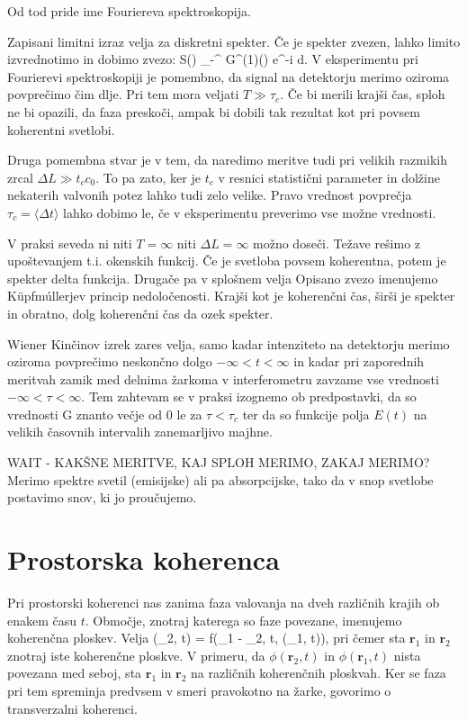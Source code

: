 Od tod pride ime Fouriereva spektroskopija. 

Zapisani limitni izraz velja za diskretni spekter. Če je spekter zvezen, lahko limito izvrednotimo in dobimo
zvezo:
\beq
S(\omega) \propto \int_{-\infty}^{\infty} G^{(1)}(\tau) e^{-i\omega \tau} d\tau.
\eeq
V eksperimentu pri Fourierevi spektroskopiji je pomembno, da signal na detektorju merimo oziroma
povprečimo čim dlje. Pri tem mora veljati $T \gg \tau_c$. Če bi merili krajši čas, sploh ne bi opazili, da
faza preskoči, ampak bi dobili tak rezultat kot pri povsem koherentni svetlobi. 

Druga pomembna stvar je v tem, da naredimo meritve tudi pri velikih razmikih zrcal $\Delta L \gg t_cc_0$. 
To pa zato, ker je $t_c$ v resnici statistični parameter in dolžine nekaterih valvonih potez lahko tudi 
zelo velike. Pravo vrednost povprečja $\tau_c = \langle \Delta t\rangle$ lahko dobimo le, če v eksperimentu
preverimo vse možne vrednosti. 

V praksi seveda ni niti $T= \infty$ niti $\Delta L = \infty$ možno doseči. Težave rešimo z upoštevanjem
t.i. okenskih funkcij. 
Če je svetloba povsem koherentna, potem je spekter delta funkcija. Drugače pa v splošnem velja
Opisano zvezo imenujemo K\"upfm\'ullerjev princip nedoločenosti. Krajši kot je koherenčni čas, širši je 
spekter in obratno, dolg koherenčni čas da ozek spekter.

Wiener Kinčinov izrek zares velja, samo kadar intenziteto na detektorju merimo oziroma povprečimo
neskončno dolgo $-\infty < t <\infty$ 
in kadar pri zaporednih meritvah zamik med delnima žarkoma v interferometru zavzame
vse vrednosti $-\infty <\tau <\infty$. Tem zahtevam se v praksi izognemo ob predpostavki, da so 
vrednosti G znanto večje od 0 le za $\tau <\tau_c$ ter da so funkcije polja $E(t)$ na velikih
časovnih intervalih zanemarljivo majhne.


WAIT - KAKŠNE MERITVE, KAJ SPLOH MERIMO, ZAKAJ MERIMO? Merimo spektre svetil (emisijske) ali pa 
absorpcijske, tako da v snop svetlobe postavimo snov, ki jo proučujemo. 


\section{Prostorska koherenca}
Pri prostorski koherenci nas zanima faza valovanja na dveh različnih krajih ob enakem času $t$. Območje, 
znotraj katerega so faze povezane, imenujemo koherenčna ploskev. Velja
\beq
\phi (_2, t) = f(_1 - _2, t, \phi(_1, t)),
\eeq
pri čemer sta $\mathbf{r}_1$ in $\mathbf{r}_2$ znotraj iste koherenčne ploskve.  V primeru, da
$\phi (\mathbf{r}_2, t)$ in $\phi (\mathbf{r}_1,t)$ nista povezana med seboj, sta $\mathbf{r}_1$
in $\mathbf{r}_2$ na različnih koherenčnih ploskvah. Ker se faza pri tem spreminja predvsem 
v smeri pravokotno na žarke, govorimo o transverzalni koherenci.

